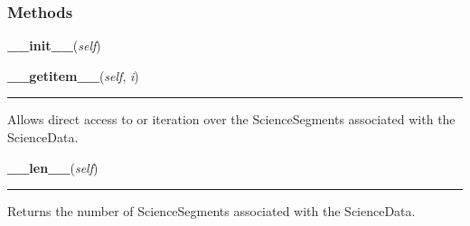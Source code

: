
  \subsubsection{Methods}

    \label{pipeline:ScienceData:__init__}
    \vspace{0.5ex}

    \noindent\begin{boxedminipage}{\textwidth}

    \raggedright \textbf{\_\_init\_\_}(\textit{self})

    \end{boxedminipage}

    \label{pipeline:ScienceData:__getitem__}
    \vspace{0.5ex}

    \noindent\begin{boxedminipage}{\textwidth}

    \raggedright \textbf{\_\_getitem\_\_}(\textit{self}, \textit{i})

    \vspace{-1.5ex}

    \rule{\textwidth}{0.5\fboxrule}
    Allows direct access to or iteration over the ScienceSegments 
    associated with the ScienceData.

    \vspace{1ex}

    \end{boxedminipage}

    \label{pipeline:ScienceData:__len__}
    \vspace{0.5ex}

    \noindent\begin{boxedminipage}{\textwidth}

    \raggedright \textbf{\_\_len\_\_}(\textit{self})

    \vspace{-1.5ex}

    \rule{\textwidth}{0.5\fboxrule}
    Returns the number of ScienceSegments associated with the 
    ScienceData.

    \vspace{1ex}

    \end{boxedminipage}

